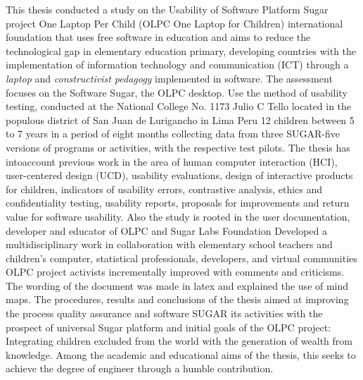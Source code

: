 This thesis conducted a study on the Usability of Software Platform Sugar project One Laptop Per Child (OLPC One Laptop for Children) international foundation that uses free software in education and aims to reduce the technological gap in elementary education primary, developing countries with the implementation of information technology and communication (ICT) through a \textit{laptop} and \textit{constructivist pedagogy} implemented in software. The assessment focuses on the Software Sugar, the OLPC desktop. Use the method of usability testing, conducted at the National College No. 1173 Julio C Tello located in the populous district of San Juan de Lurigancho in Lima Peru 12 children between 5 to 7 years in a period of eight months collecting data from three SUGAR-five versions of programs or activities, with the respective test pilots. The thesis has intoaccount previous work in the area of human computer interaction (HCI), user-centered design (UCD), usability evaluations, design of interactive products for children, indicators of usability errors, contrastive analysis, ethics and confidentiality testing, usability reports, proposals for improvements and return value for software usability. Also the study is rooted in the user documentation, developer and educator of OLPC and Sugar Labs Foundation Developed a multidisciplinary work in collaboration with elementary school teachers and children's computer, statistical professionals, developers, and virtual communities OLPC project activists incrementally improved with comments and criticisms. The wording of the document was made in latex and explained the use of mind maps. The procedures, results and conclusions of the thesis aimed at improving the process quality assurance and software SUGAR its activities with the prospect of universal Sugar platform and initial goals of the OLPC project: Integrating children excluded from the world with the generation of wealth from knowledge. Among the academic and educational aims of the thesis, this seeks to achieve the degree of engineer through a humble contribution.